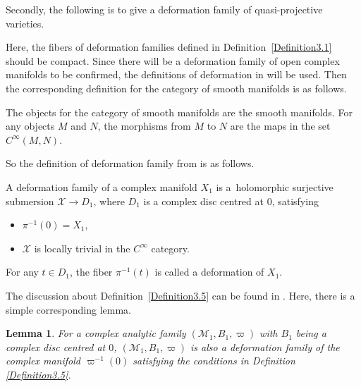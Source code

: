 \documentclass[pdftex]{sigma}
\numberwithin{equation}{section}
\newtheorem{Lemma}[Theorem]{Lemma}
\begin{document}
Secondly, the following is to give a deformation family of quasi-projective varieties.

Here, the fibers of deformation families defined in Definition~\ref{Definition3.1} should be compact. Since there will be a deformation family of open complex manifolds to be confirmed, the definitions of deformation in \cite{Elizabeth-Francisco} will be used. Then the corresponding definition for the category of smooth manifolds is as follows.

\begin{Definition} \label{Definition3.4}
 The objects for the category of smooth manifolds are the smooth manifolds. For any objects $M$ and $N$, the morphisms from $M$ to $N$ are the maps in the set $C^\infty (M,N)$.
\end{Definition}

So the definition of deformation family from \cite{Elizabeth-Francisco} is as follows.

\begin{Definition} \label{Definition3.5}
 A deformation family of a complex manifold $X_1$ is a~holomorphic surjective submersion $\mathcal{X} \rightarrow D_1$, where $D_1$ is a complex disc centred at $0$, satisfying
\begin{itemize}\itemsep=0pt
\item[$(1)$] $\pi^{-1}(0)=X_1$,
\item[$(2)$] $\mathcal{X}$ is locally trivial in the $C^\infty$ category.
\end{itemize}
For any $t\in D_1$, the fiber $\pi^{-1}(t)$ is called a deformation of $X_1$.
\end{Definition}

The discussion about Definition~\ref{Definition3.5} can be found in \cite{Edoardo-Elizabeth-Francisco}. Here, there is a simple corresponding lemma.

\begin{Lemma} \label{Lemma3.6}
For a complex analytic family $(\mathcal{M}_1, B_1, \varpi)$ with $B_1$ being a complex disc centred at $0$, $(\mathcal{M}_1, B_1, \varpi)$ is also a deformation family of the complex manifold $\varpi^{-1}(0)$ satisfying the conditions in Definition {\rm\ref{Definition3.5}}.
\end{Lemma}
\end{document}
